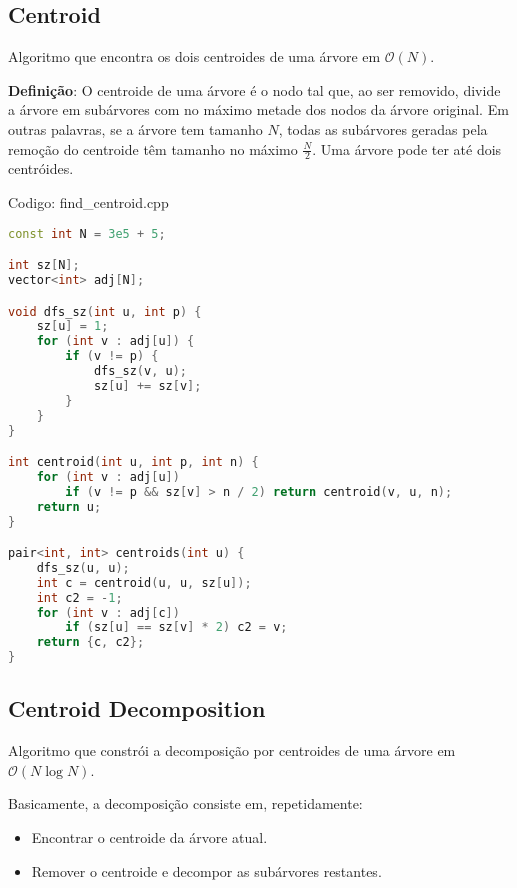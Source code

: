 \documentclass[10pt, a4paper, oneside]{book}
\begin{document}
\subsection{Centroid}


Algoritmo que encontra os dois centroides de uma árvore em $\mathcal{O}(N)$.



\textbf{Definição}: O centroide de uma árvore é o nodo tal que, ao ser removido, divide a árvore em subárvores com no máximo metade dos nodos da árvore original. Em outras palavras, se a árvore tem tamanho $N$, todas as subárvores geradas pela remoção do centroide têm tamanho no máximo $\frac{N}{2}$. Uma árvore pode ter até dois centróides.

\hfill

Codigo: find\_centroid.cpp

\begin{lstlisting}[language=C++]
const int N = 3e5 + 5;

int sz[N];
vector<int> adj[N];

void dfs_sz(int u, int p) {
    sz[u] = 1;
    for (int v : adj[u]) {
        if (v != p) {
            dfs_sz(v, u);
            sz[u] += sz[v];
        }
    }
}

int centroid(int u, int p, int n) {
    for (int v : adj[u])
        if (v != p && sz[v] > n / 2) return centroid(v, u, n);
    return u;
}

pair<int, int> centroids(int u) {
    dfs_sz(u, u);
    int c = centroid(u, u, sz[u]);
    int c2 = -1;
    for (int v : adj[c])
        if (sz[u] == sz[v] * 2) c2 = v;
    return {c, c2};
}\end{lstlisting}
\hfill

\subsection{Centroid Decomposition}


Algoritmo que constrói a decomposição por centroides de uma árvore em $\mathcal{O}(N \log N)$.



Basicamente, a decomposição consiste em, repetidamente:



\begin{itemize}
\item Encontrar o centroide da árvore atual.
\item Remover o centroide e decompor as subárvores restantes.
\end{itemize}
\end{document}
